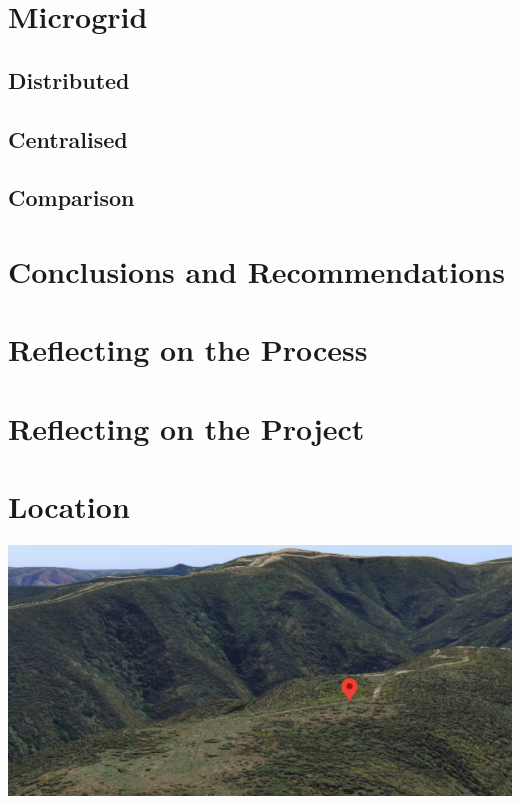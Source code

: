 \documentclass[journal]{IEEEtran}
\begin{document}
\section{Microgrid}
        \subsection{Distributed}
        \subsection{Centralised}
        \subsection{Comparison}

\section{Conclusions and Recommendations}

\section{Reflecting on the Process}

\section{Reflecting on the Project}



\newpage
\onecolumn
\appendices
    \section{Location}
        \includegraphics[width=\textwidth]{fig/pin_location.png}
        \label{ap:location}
\end{document}
